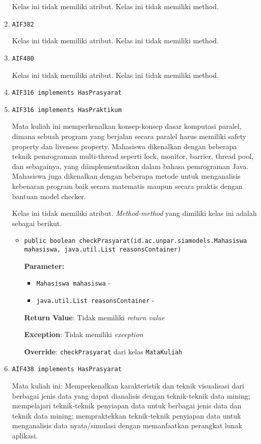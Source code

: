 \documentclass{article}
\begin{document}
\begin{enumerate}
Kelas ini tidak memiliki atribut. Kelas ini tidak memiliki method. \item \texttt{AIF382}



Kelas ini tidak memiliki atribut. Kelas ini tidak memiliki method. \item \texttt{AIF480}



Kelas ini tidak memiliki atribut. Kelas ini tidak memiliki method. \item \texttt{AIF316 implements HasPrasyarat}

\item \texttt{AIF316 implements HasPraktikum}

Mata kuliah ini memperkenalkan konsep-konsep dasar komputasi paralel, dimana sebuah 
 program yang berjalan secara paralel harus memiliki safety property dan liveness property. 
 Mahasiswa dikenalkan dengan beberapa teknik pemrograman multi-thread
 seperti lock, monitor, barrier, thread pool, dan sebagainya, yang diimplementasikan 
 dalam bahasa pemrograman Java. Mahasiswa juga dikenalkan dengan beberapa metode untuk 
 menganalisis kebenaran program baik secara matematis maupun secara praktis dengan bantuan 
 model checker.

Kelas ini tidak memiliki atribut. \textit{Method-method} yang dimiliki kelas ini adalah sebagai berikut.
\begin{itemize}
\item \texttt{public boolean checkPrasyarat(id.ac.unpar.siamodels.Mahasiswa mahasiswa, java.util.List reasonsContainer)}



\textbf{Parameter:}
\begin{itemize}
\item \texttt{Mahasiswa mahasiswa} - 
\item \texttt{java.util.List reasonsContainer} - 
\end{itemize}
\textbf{Return Value}: Tidak memiliki \textit{return value}

\textbf{Exception}: Tidak memiliki \textit{exception}

\textbf{Override}: \texttt{checkPrasyarat} dari kelas \texttt{MataKuliah}

\end{itemize}
\item \texttt{AIF438 implements HasPrasyarat}

Mata kuliah ini: Memperkenalkan karakteristik dan teknik visualisasi dari
 berbagai jenis data yang dapat dianalisis dengan teknik-teknik data mining;
 mempelajari teknik-teknik penyiapan data untuk berbagai jenis data dan teknik
 data mining; mempraktekkan teknik-teknik penyiapan data untuk menganalisis
 data nyata/simulasi dengan memanfaatkan perangkat lunak aplikasi.


\end{enumerate}
\end{document}

